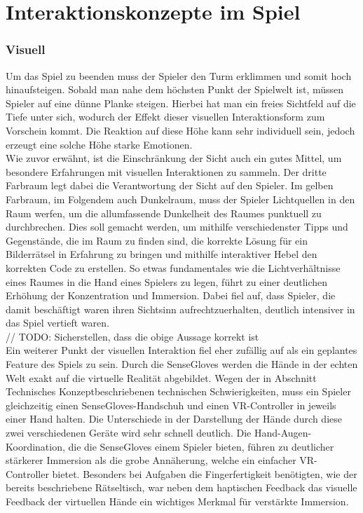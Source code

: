 \newpage
\noindent
\section{Interaktionskonzepte im Spiel}
\subsubsection{Visuell}
Um das Spiel zu beenden muss der Spieler den Turm erklimmen und somit hoch hinaufsteigen. Sobald man nahe dem höchsten Punkt der Spielwelt ist, müssen Spieler auf eine dünne Planke steigen. Hierbei hat man ein freies Sichtfeld auf die Tiefe unter sich, wodurch der Effekt dieser visuellen Interaktionsform zum Vorschein kommt. Die Reaktion auf diese Höhe kann sehr individuell sein, jedoch erzeugt eine solche Höhe starke Emotionen.\\
Wie zuvor erwähnt, ist die Einschränkung der Sicht auch ein gutes Mittel, um besondere Erfahrungen mit visuellen Interaktionen zu sammeln. Der dritte Farbraum legt dabei die Verantwortung der Sicht auf den Spieler. Im gelben Farbraum, im Folgendem auch Dunkelraum, muss der Spieler Lichtquellen in den Raum werfen, um die allumfassende Dunkelheit des Raumes punktuell zu durchbrechen. Dies soll gemacht werden, um mithilfe verschiedenster Tipps und Gegenstände, die im Raum zu finden sind, die korrekte Lösung für ein Bilderrätsel in Erfahrung zu bringen und mithilfe interaktiver Hebel den korrekten Code zu erstellen. So etwas fundamentales wie die Lichtverhältnisse eines Raumes in die Hand eines Spielers zu legen, führt zu einer deutlichen Erhöhung der Konzentration und Immersion. Dabei fiel auf, dass Spieler, die damit beschäftigt waren ihren Sichtsinn aufrechtzuerhalten, deutlich intensiver in das Spiel vertieft waren.\\
// TODO: Sicherstellen, dass die obige Aussage korrekt ist\\
Ein weiterer Punkt der visuellen Interaktion fiel eher zufällig auf als ein geplantes Feature des Spiels zu sein. Durch die SenseGloves werden die Hände in der echten Welt exakt auf die virtuelle Realität abgebildet. Wegen der in Abschnitt \dq Technisches Konzept\dq beschriebenen technischen Schwierigkeiten, muss ein Spieler gleichzeitig einen SenseGloves-Handschuh und einen VR-Controller in jeweils einer Hand halten. Die Unterschiede in der Darstellung der Hände durch diese zwei verschiedenen Geräte wird sehr schnell deutlich. Die Hand-Augen-Koordination, die die SenseGloves einem Spieler bieten, führen zu deutlicher stärkerer Immersion als die grobe Annäherung, welche ein einfacher VR-Controller bietet. Besonders bei Aufgaben die Fingerfertigkeit benötigten, wie der bereits beschriebene Rätseltisch, war neben dem haptischen Feedback das visuelle Feedback der virtuellen Hände ein wichtiges Merkmal für verstärkte Immersion.
